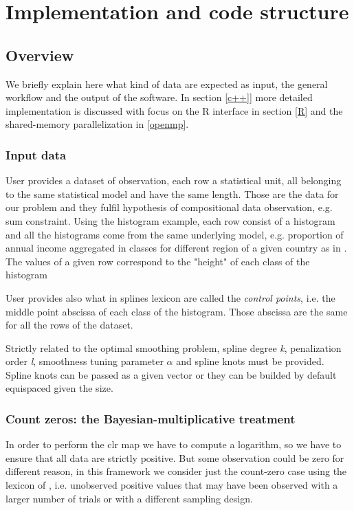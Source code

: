 \chapter{Implementation and code structure}
\label{code}

\noindent 



\section{Overview}
We briefly explain here what kind of data are expected as input, the general workflow and the output of the software. In section \ref{c++}] more detailed implementation is discussed with focus on the R interface in section \ref{R} and the shared-memory parallelization in \ref{openmp}.

\subsection{Input data}
User provides a dataset of observation, each row a statistical unit, all belonging to the same statistical model and have the same length. Those are the data for our problem and they fulfil hypothesis of compositional data observation, e.g. sum constraint. Using the histogram example, each row consist of a histogram and all the histograms come from the same underlying model, e.g. proportion of annual income aggregated in classes for different region of a given country as in \cite{paper:pacs}. The values of a given row correspond to the "height" of each class of the histogram

User provides also what in splines lexicon are called the \textit{control points}, i.e. the middle point abscissa of each class of the histogram. Those abscissa are the same for all the rows of the dataset.

Strictly related to the optimal smoothing problem, spline degree \textit{k}, penalization order \textit{l}, smoothness tuning parameter \textit{$\alpha$} and spline knots must be provided. Spline knots can be passed as a given vector or they can be builded by default equispaced given the size.
\subsection{Count zeros: the Bayesian-multiplicative treatment} \label{BM}
In order to perform the clr map we have to compute a logarithm, so we have to ensure that all data are strictly positive. But some observation could be zero for different reason, in this framework we consider just the count-zero case using the lexicon of \cite{fernandez:zeros}, i.e. unobserved positive values that may have been observed with a larger number of trials or with a different sampling design.

